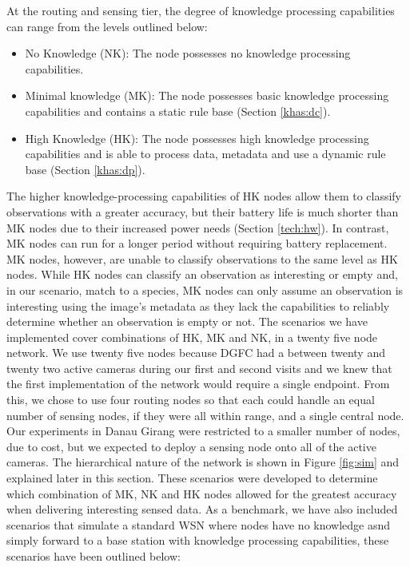 	At the routing and sensing tier, the degree of knowledge processing capabilities can range from the levels outlined below:
	
	\begin{itemize}
		\item No Knowledge (NK): The node possesses no knowledge processing capabilities.
		\item Minimal knowledge (MK): The node possesses basic knowledge processing capabilities and contains a static rule base (Section \ref{khas:dc}).
		\item High Knowledge (HK): The node possesses high knowledge processing capabilities and is able to process data, metadata and use a dynamic rule base (Section \ref{khas:dp}).
	\end{itemize}
	
	The higher knowledge-processing capabilities of HK nodes allow them to classify observations with a greater accuracy, but their battery life is much shorter than MK nodes due to their increased power needs (Section \ref{tech:hw}). In contrast, MK nodes can run for a longer period without requiring battery replacement. MK nodes, however, are unable to classify observations to the same level as HK nodes. While HK nodes can classify an observation as interesting or empty and, in our scenario, match to a species, MK nodes can only assume an observation is interesting using the image's metadata as they lack the capabilities to reliably determine whether an observation is empty or not. The scenarios we have implemented cover combinations of HK, MK and NK, in a twenty five node network. We use twenty five nodes because DGFC had a between twenty and twenty two active cameras during our first and second visits and we knew that the first implementation of the network would require a single endpoint. From this, we chose to use four routing nodes so that each could handle an equal number of sensing nodes, if they were all within range, and a single central node. Our experiments in Danau Girang were restricted to a smaller number of nodes, due to cost, but we expected to deploy a sensing node onto all of the active cameras. The hierarchical nature of the network is shown in Figure \ref{fig:sim} and explained later in this section. These scenarios were developed to determine which combination of MK, NK and HK nodes allowed for the greatest accuracy when delivering interesting sensed data. As a benchmark, we have also included scenarios that simulate a standard WSN where nodes have no knowledge asnd simply forward to a base station with knowledge processing capabilities, these scenarios have been outlined below:
	
